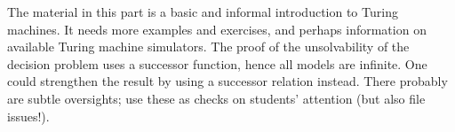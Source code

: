 \documentclass[../../include/open-logic-part]{subfiles}
\begin{document}

\begin{editorial}
The material in this part is a basic and informal introduction to
Turing machines. It needs more examples and exercises, and perhaps
information on available Turing machine simulators. The proof of the
unsolvability of the decision problem uses a successor function, hence
all models are infinite.  One could strengthen the result by using a
successor relation instead. There probably are subtle oversights; use
these as checks on students' attention (but also file issues!).
\end{editorial}



\OLEndPartHook
\end{document}
